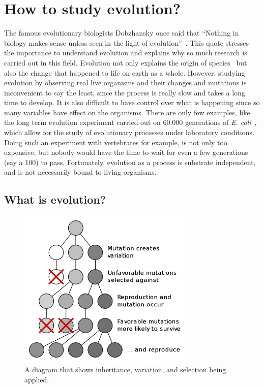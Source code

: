 \documentclass[12pt,oneside,listof=totoc,paper=a4,headings=small]{scrbook}
\begin{document}
\section{How to study evolution?}
The famous evolutionary biologists Dobzhansky once said that ``Nothing in biology makes sense unless seen in the light of evolution''~\cite{dobzhansky2013nothing}. This quote stresses the importance to understand evolution and explains why so much research is carried out in this field. Evolution not only explains the origin of species~\cite{darwin2004origin} but also the change that happened to life on earth as a whole. However, studying evolution by observing real live organisms and their changes and mutations is inconvenient to say the least, since the process is really slow and takes a long time to develop. It is also difficult to have control over what is happening since so many variables have effect on the organisms. There are only few examples, like the long term evolution experiment carried out on 60.000 generations of \textit{E. coli}~\cite{lenski2003evolutionary}, which allow for the study of evolutionary processes under laboratory conditions. Doing such an experiment with vertebrates for example, is not only too expensive, but nobody would have the time to wait for even a few generations (say a 100) to pass. Fortunately, evolution as a process is substrate independent, and is not necessarily bound to living organisms.
\subsection{What is evolution?}
\begin{figure}[h!]
\centering
\includegraphics[width=0.75\textwidth,height=0.75\textheight,keepaspectratio]{images/1024px-Mutation_and_selection_diagram.png}
\caption{A diagram that shows inheritance, variation, and selection being applied.~\cite{evolDiagram}}
\label{fig:evolution}
\end{figure}
\end{document}
